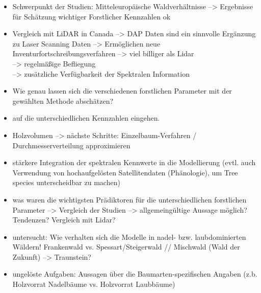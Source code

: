 \medskip

\begin{itemize}
	\item Schwerpunkt der Studien: Mitteleuropäische Waldverhältnisse --> Ergebnisse für Schätzung wichtiger Forstlicher Kennzahlen ok
	\item Vergleich mit LiDAR in Canada --> DAP Daten sind ein sinnvolle Ergänzung zu Laser Scanning Daten --> Ermöglichen neue Inventurfortschreibungsverfahren
	 --> viel billiger als Lidar \\ --> regelmäßige Befliegung \\ --> zusätzliche Verfügbarkeit der Spektralen Information
\end{itemize}

\medskip
\begin{itemize}
	\item Wie genau lassen sich die verschiedenen forstlichen Parameter mit der gewählten Methode abschätzen?
	\item auf die unterschiedlichen Kennzahlen eingehen. 
	\item Holzvolumen --> nächste Schritte: Einzelbaum-Verfahren / Durchmesserverteilung approximieren
	\item stärkere Integration der spektralen Kennwerte in die Modellierung (evtl. auch Verwendung von hochaufgelösten Satellitendaten (Phänologie), um Tree species unterscheidbar zu machen)
	\item was waren die wichtigsten Prädiktoren für die unterschiedlichen forstlichen Parameter --> Vergleich der Studien --> allgemeingültige Aussage möglich? Tendenzen? Vergleich mit Lidar?
	\item untersucht: Wie verhalten sich die Modelle in nadel- bzw. laubdominierten Wäldern! Frankenwald vs. Spessart/Steigerwald // Mischwald (Wald der Zukunft) --> Traunstein?
	\item ungelöste Aufgaben: Aussagen über die Baumarten-spezifischen Angaben (z.b. Holzvorrat Nadelbäume vs. Holzvorrat Laubbäume)
 	
\end{itemize}












